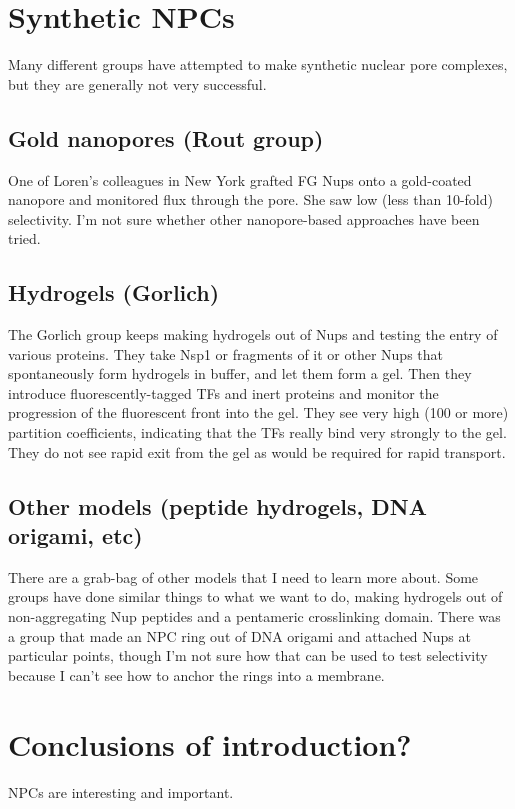 \section{Synthetic NPCs}
Many different groups have attempted to make synthetic nuclear pore complexes, but they are generally not very successful.
\subsection{Gold nanopores (Rout group)}
One of Loren's colleagues in New York grafted FG Nups onto a gold-coated nanopore and monitored flux through the pore.  She saw low (less than 10-fold) selectivity.  I'm not sure whether other nanopore-based approaches have been tried.
\subsection{Hydrogels (Gorlich)}
The Gorlich group keeps making hydrogels out of Nups and testing the entry of various proteins.  They take Nsp1 or fragments of it or other Nups that spontaneously form hydrogels in buffer, and let them form a gel.  Then they introduce fluorescently-tagged TFs and inert proteins and monitor the progression of the fluorescent front into the gel.  They see very high (100 or more) partition coefficients, indicating that the TFs really bind very strongly to the gel.  They do not see rapid exit from the gel as would be required for rapid transport.
\subsection{Other models (peptide hydrogels, DNA origami, etc)}
There are a grab-bag of other models that I need to learn more about.  Some groups have done similar things to what we want to do, making hydrogels out of non-aggregating Nup peptides and a pentameric crosslinking domain.  There was a group that made an NPC ring out of DNA origami and attached Nups at particular points, though I'm not sure how that can be used to test selectivity because I can't see how to anchor the rings into a membrane.
\section{Conclusions of introduction?}
NPCs are interesting and important.

